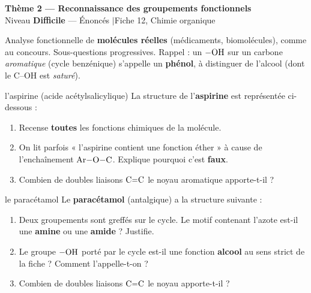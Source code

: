 \documentclass[11pt,a4paper]{article}
\newcommand{\banner}[2]{%
\begin{tcolorbox}[enhanced,colback=primary,colframe=primary,arc=5pt,boxrule=0pt,
   left=5mm,right=5mm,top=2.5mm,bottom=2.5mm,coltext=white]
{\large\bfseries #1}\\[1pt]{\small #2}
\end{tcolorbox}\vspace{2pt}}
\begin{document}
\banner{Thème 2 — Reconnaissance des groupements fonctionnels}{Niveau \textbf{Difficile} — Énoncés \quad$\vert$\quad Fiche 12, Chimie organique}

\begin{consigne}
Analyse fonctionnelle de \textbf{molécules réelles} (médicaments, biomolécules), comme au concours. Sous-questions progressives. Rappel : un $\ce{-OH}$ sur un carbone \emph{aromatique} (cycle benzénique) s'appelle un \textbf{phénol}, à distinguer de l'alcool (dont le C--OH est \emph{saturé}).
\end{consigne}

\begin{exo}{l'aspirine (acide acétylsalicylique)}
La structure de l'\textbf{aspirine} est représentée ci-dessous :
\begin{center}\end{center}
\begin{enumerate}[label=\textbf{\alph*)},leftmargin=2em,itemsep=1pt]
  \item Recense \textbf{toutes} les fonctions chimiques de la molécule.
  \item On lit parfois « l'aspirine contient une fonction éther » à cause de l'enchaînement $\ce{Ar-O-C}$. Explique pourquoi c'est \textbf{faux}.
  \item Combien de doubles liaisons $\ce{C=C}$ le noyau aromatique apporte-t-il ?
\end{enumerate}
\end{exo}

\begin{exo}{le paracétamol}
Le \textbf{paracétamol} (antalgique) a la structure suivante :
\begin{center}\end{center}
\begin{enumerate}[label=\textbf{\alph*)},leftmargin=2em,itemsep=1pt]
  \item Deux groupements sont greffés sur le cycle. Le motif contenant l'azote est-il une \textbf{amine} ou une \textbf{amide} ? Justifie.
  \item Le groupe $\ce{-OH}$ porté par le cycle est-il une fonction \textbf{alcool} au sens strict de la fiche ? Comment l'appelle-t-on ?
  \item Combien de doubles liaisons $\ce{C=C}$ le noyau apporte-t-il ?
\end{enumerate}
\end{exo}
\end{document}
